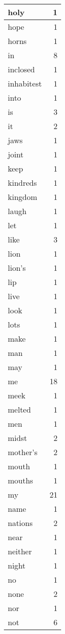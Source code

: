 \begin{center}
\begin{longtable}{l|r}
holy & 1 \\ \hline
hope & 1 \\ \hline
horns & 1 \\ \hline
in & 8 \\ \hline
inclosed & 1 \\ \hline
inhabitest & 1 \\ \hline
into & 1 \\ \hline
is & 3 \\ \hline
it & 2 \\ \hline
jaws & 1 \\ \hline
joint & 1 \\ \hline
keep & 1 \\ \hline
kindreds & 1 \\ \hline
kingdom & 1 \\ \hline
laugh & 1 \\ \hline
let & 1 \\ \hline
like & 3 \\ \hline
lion & 1 \\ \hline
lion's & 1 \\ \hline
lip & 1 \\ \hline
live & 1 \\ \hline
look & 1 \\ \hline
lots & 1 \\ \hline
make & 1 \\ \hline
man & 1 \\ \hline
may & 1 \\ \hline
me & 18 \\ \hline
meek & 1 \\ \hline
melted & 1 \\ \hline
men & 1 \\ \hline
midst & 2 \\ \hline
mother's & 2 \\ \hline
mouth & 1 \\ \hline
mouths & 1 \\ \hline
my & 21 \\ \hline
name & 1 \\ \hline
nations & 2 \\ \hline
near & 1 \\ \hline
neither & 1 \\ \hline
night & 1 \\ \hline
no & 1 \\ \hline
none & 2 \\ \hline
nor & 1 \\ \hline
not & 6 \\ \hline

\end{longtable}
\end{center}

